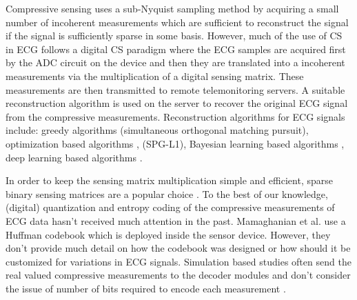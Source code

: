 Compressive sensing \cite{donoho2006compressed,baraniuk2007compressive,
candes2006compressive, candes2008introduction, candes2006near}
uses a sub-Nyquist sampling method by acquiring a small number
of incoherent measurements which are sufficient to reconstruct
the signal if the signal is sufficiently sparse in some
basis. However, much of the use of CS in ECG follows
a digital CS paradigm \cite{mamaghanian2011compressed} where
the ECG samples are acquired first by the ADC circuit on the
device and then they are translated into a incoherent
measurements via the multiplication of a digital sensing matrix.
These measurements are then transmitted
to remote telemonitoring servers. A suitable reconstruction
algorithm is used on the server to recover the original
ECG signal from the compressive measurements.
Reconstruction algorithms for ECG signals include:
greedy algorithms 
\cite{polania2011compressed} (simultaneous orthogonal matching pursuit),
optimization based algorithms \cite{zhang2014energy},
\cite{mamaghanian2011compressed} (SPG-L1),
Bayesian learning based algorithms
\cite{zhang2012compressed,zhang2014spatiotemporal,zhang2013extension},
deep learning based algorithms \cite{zhang2021csnet}.

In order to keep the sensing matrix multiplication
simple and efficient, sparse binary sensing matrices
are a popular choice \cite{mamaghanian2011compressed,zhang2012compressed}.
To the best of our knowledge, (digital) quantization and entropy coding of
the compressive measurements of ECG data hasn't received
much attention in the past.
Mamaghanian et al.\cite{mamaghanian2011compressed} use a Huffman codebook
which is deployed inside the sensor device. However, they don't
provide much detail on how the codebook was designed or how should
it be customized for variations in ECG signals.
Simulation based studies often send the real valued compressive
measurements to the decoder modules and don't consider the issue
of number of bits required to encode each measurement
\cite{zhang2012compressed}. 

